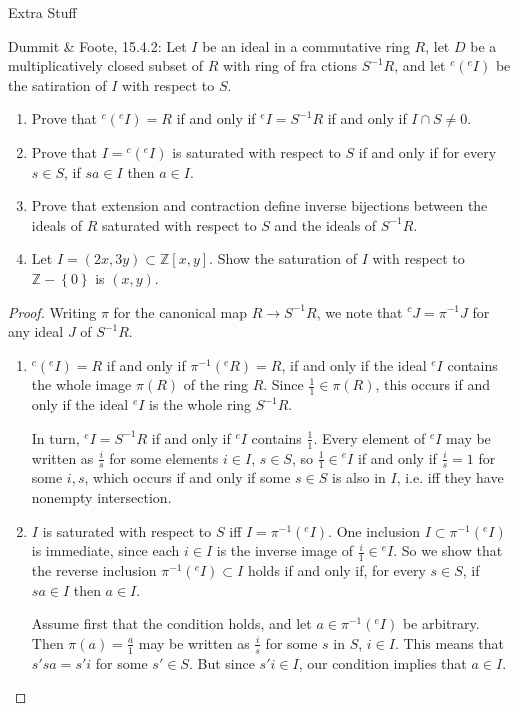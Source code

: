 \documentclass[12pt]{article}
\newcommand{\Z}{\mathbb{Z}}
\theoremstyle{definition}
\newenvironment{problem}[2][Problem]{\begin{trivlist}
\item[\hskip \labelsep {\bfseries #1}\hskip \labelsep {\bfseries #2.}]}{\end{trivlist}}
\begin{document}
\begin{section}{Extra Stuff}
	\begin{problem}{1}
		Dummit \& Foote, 15.4.2: Let $I$ be an ideal in a commutative ring $R$, let $D$ be a multiplicatively closed subset of $R$ with ring of fra ctions $S^{-1}R$, and let $^c(^eI)$ be the satiration of $I$ with respect to $S$.
		\begin{enumerate}[label=(\alph*)]
			\item Prove that $^c(^eI) = R$ if and only if $^eI = S^{-1}R$ if and only if $I \cap S \neq 0$.
			\item Prove that $I = {}^c(^eI)$ is saturated with respect to $S$ if and only if for every $s \in S$, if $sa \in I$ then $a \in I $.
			\item Prove that extension and contraction define inverse bijections between the ideals of $R$ saturated with respect to $S$ and the ideals of $S^{-1}R$.
			\item Let $I = (2x, 3y) \subset \Z[x,y]$. Show the saturation of $I$ with respect to $\Z - \left\{ 0 \right\}$ is $(x,y)$.
		\end{enumerate}
	\end{problem}
	\begin{proof}
		Writing $\pi$ for the canonical map $R \to S^{-1}R$, we note that $^cJ = \pi^{-1}J$ for any ideal $J$ of $S^{-1}R$.
		\begin{enumerate}[label=(\alph*)]
			\item $^c(^eI) = R$ if and only if $\pi^{-1}(^eR) = R$, if and only if the ideal $^eI$ contains the whole image $\pi(R)$ of the ring $R$. Since $\frac{1}{1} \in \pi(R)$, this occurs if and only if the ideal $^eI$ is the whole ring $S^{-1}R$.
				\par In turn, $^eI = S^{-1}R$ if and only if $^eI$ contains $\frac{1}{1}$. Every element of $^eI$ may be written as $\frac{i}{s}$ for some elements $i \in I$, $s \in S$, so $\frac{1}{1} \in {^eI}$ if and only if $\frac{i}{s} = 1$ for some $i, s$, which occurs if and only if some $s \in S$ is also in $I$, i.e. iff they have nonempty intersection.
			\item $I$ is saturated with respect to $S$ iff $I = \pi^{-1}(^eI)$. One inclusion $I \subset \pi^{-1}(^eI)$ is immediate, since each $i \in I$ is the inverse image of $\frac{i}{1} \in {^eI}$. So we show that the reverse inclusion $\pi^{-1}(^eI) \subset I$ holds if and only if, for every $ s \in S$, if $sa \in I$ then $a \in I$.
				\par Assume first that the condition holds, and let $a \in \pi^{-1}(^eI)$ be arbitrary. Then $\pi(a) = \frac{a}{1}$ may be written as $\frac{i}{s}$ for some $s$ in $S$, $i \in I$. This means that $s'sa = s'i$ for some $s' \in S$. But since $s'i \in I$, our condition implies that $a \in I$.

\end{enumerate}
\end{proof}
\end{section}
\end{document}

